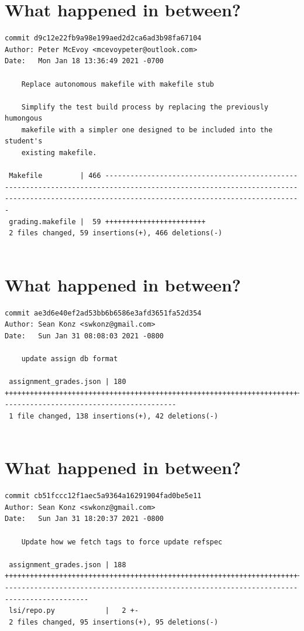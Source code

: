 \documentclass{article}
\begin{document}
\newpage

\section*{What happened in between?}
\vspace{2ex}
\begin{verbatim}
commit d9c12e22fb9a98e199aed2d2ca6ad3b98fa67104
Author: Peter McEvoy <mcevoypeter@outlook.com>
Date:   Mon Jan 18 13:36:49 2021 -0700

    Replace autonomous makefile with makefile stub
    
    Simplify the test build process by replacing the previously humongous
    makefile with a simpler one designed to be included into the student's
    existing makefile.

 Makefile         | 466 -------------------------------------------------------------------------------------------------------------------------------------------------------------------------------------------
 grading.makefile |  59 ++++++++++++++++++++++++
 2 files changed, 59 insertions(+), 466 deletions(-)


\end{verbatim}

\newpage


\section*{What happened in between?}
\vspace{2ex}
\begin{verbatim}
commit ae3d6e40ef2ad53bb6b6586e3afd3651fa52d354
Author: Sean Konz <swkonz@gmail.com>
Date:   Sun Jan 31 08:08:03 2021 -0800

    update assign db format

 assignment_grades.json | 180 ++++++++++++++++++++++++++++++++++++++++++++++++++++++++++++++++++++++++++++++++++++++++++++++++++++++++++++++++++++++++++++++++++++++++++------------------------------------------
 1 file changed, 138 insertions(+), 42 deletions(-)


\end{verbatim}

\newpage

\section*{What happened in between?}
\vspace{2ex}
\begin{verbatim}
commit cb51fccc12f1aec5a9364a16291904fad0be5e11
Author: Sean Konz <swkonz@gmail.com>
Date:   Sun Jan 31 18:20:37 2021 -0800

    Update how we fetch tags to force update refspec

 assignment_grades.json | 188 ++++++++++++++++++++++++++++++++++++++++++++++++++++++++++++++++++++++++++++++++++++++++++-------------------------------------------------------------------------------------------
 lsi/repo.py            |   2 +-
 2 files changed, 95 insertions(+), 95 deletions(-)

\end{verbatim}
\end{document}
